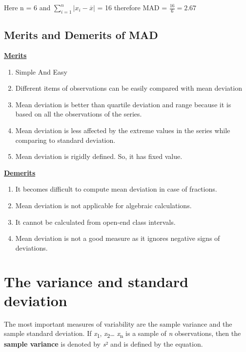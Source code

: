 \documentclass[
]{book}
\begin{document}
Here n = 6 and \(\sum_{i = 1}^{n}\left| x_{i} - \overline{x} \right|\) =
16 therefore MAD = \(\frac{16}{6} = 2.67\)

\hypertarget{merits-and-demerits-of-mad}{%
\subsection{Merits and Demerits of MAD}\label{merits-and-demerits-of-mad}}

\textbf{\underline{Merits}}

\begin{enumerate}
\def\labelenumi{\arabic{enumi}.}
\item
  Simple And Easy
\item
  Different items of observations can be easily compared with mean deviation
\item
  Mean deviation is better than quartile deviation and range because it is based on all the observations of the series.
\item
  Mean deviation is less affected by the extreme values in the series while comparing to standard deviation.
\item
  Mean deviation is rigidly defined. So, it has fixed value.
\end{enumerate}

\textbf{\underline{Demerits}}

\begin{enumerate}
\def\labelenumi{\arabic{enumi}.}
\item
  It becomes difficult to compute mean deviation in case of fractions.
\item
  Mean deviation is not applicable for algebraic calculations.
\item
  It cannot be calculated from open-end class intervals.
\item
  Mean deviation is not a good measure as it ignores negative signs of deviations.
\end{enumerate}

\hypertarget{the-variance-and-standard-deviation}{%
\section{The variance and standard deviation}\label{the-variance-and-standard-deviation}}

The most important measures of variability are the sample variance and
the sample standard deviation. If \emph{x}\textsubscript{1}, \emph{x}\textsubscript{2}\ldots{} \emph{x}\textsubscript{n} is a sample
of \emph{n} observations, then the \textbf{sample variance} is denoted by \emph{s}² and
is defined by the equation.
\end{document}
